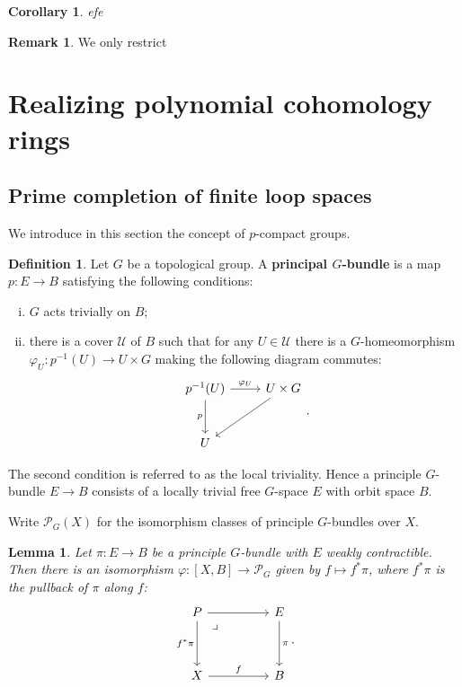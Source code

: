 \documentclass[psamsfonts]{amsart}
\newtheorem{cor}{Corollary}[section]
\newtheorem{lem}{Lemma}[section]
\theoremstyle{definition}
\newtheorem{defn}{Definition}[section]
\newtheorem{rem}{Remark}[section]
\numberwithin{equation}{section}
\begin{document}
\begin{cor}
efe
\end{cor}

\begin{rem}
We only restrict
\end{rem}

\bigskip


\section{Realizing polynomial cohomology rings}\label{Section 3}

\subsection{Prime completion of finite loop spaces} We introduce in this section the concept of $p$-compact groups.

\begin{defn}
Let $G$ be a topological group. A \textbf{principal $G$-bundle} is a map $p:E\to B$ satisfying the following conditions:\begin{enumerate}[(i)]
    \item $G$ acts trivially on $B$;
    \item there is a cover $\mathcal{U}$ of $B$ such that for any $U\in\mathcal{U}$ there is a $G$-homeomorphism $\varphi_U:p^{-1}(U)\to U\times G$ making the following diagram commutes:
    \[\begin{tikzcd}[row sep=large]
p^{-1}(U)\arrow[d,"p"']\arrow[r,"\varphi_U"]&U\times G\arrow[dl]\\
U
\end{tikzcd}.\]
\end{enumerate}
The second condition is referred to as the local triviality. Hence a principle $G$-bundle $E\to B$ consists of a locally trivial free $G$-space $E$ with orbit space $B$.
\end{defn}

Write $\mathcal{P}_G(X)$ for the isomorphism classes of principle $G$-bundles over $X$.

\begin{lem}
Let $\pi:E\to B$ be a principle $G$-bundle with $E$ weakly contractible. Then there is an isomorphism $\varphi:[X,B]\to\mathcal{P}_G$ given by $f\mapsto f^\ast\pi$, where $f^\ast\pi$ is the pullback of $\pi$ along $f$:
\[\begin{tikzcd}[column sep=huge, row sep=huge]
P\arrow[r]\arrow[phantom,dr,"\lrcorner", very near start]\arrow[d,"f^\ast\pi"']&E\arrow[d,"\pi"]\\
X\arrow[r,"f"]&B
\end{tikzcd}.\]
\end{lem}
\end{document}
